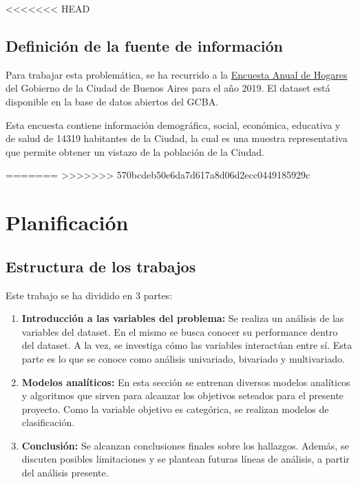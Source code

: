 \documentclass[a4paper]{article}
\begin{document}
<<<<<<< HEAD
    \subsection{Definición de la fuente de información}

        Para trabajar esta problemática, se ha recurrido a la \href{https://data.buenosaires.gob.ar/dataset/encuesta-anual-hogares/resource/3a45c563-396d-42de-ba93-8a93729e0723}{Encuesta Anual de Hogares} del Gobierno de la Ciudad de Buenos Aires para el año 2019. El dataset está disponible en la base de datos abiertos del GCBA.

        Esta encuesta contiene información demográfica, social, económica, educativa y de salud de 14319 habitantes de la Ciudad, la cual es una muestra representativa que permite obtener un vistazo de la población de la Ciudad.


=======
>>>>>>> 570bcdeb50e6da7d617a8d06d2ecc0449185929c
\newpage

\section{Planificación}

    \subsection*{Estructura de los trabajos}

        Este trabajo se ha dividido en 3 partes:
        \begin{enumerate}
            \item \textbf{Introducción a las variables del problema:} Se realiza un análisis de las variables del dataset. En el mismo se busca conocer su performance dentro del dataset. A la vez, se investiga cómo las variables interactúan entre sí. Esta parte es lo que se conoce como análisis univariado, bivariado y multivariado.
            \item \textbf{Modelos analíticos:} En esta sección se entrenan diversos modelos analíticos y algoritmos que sirven para alcanzar los objetivos seteados para el presente proyecto. Como la variable objetivo es categórica, se realizan modelos de clasificación.
            \item \textbf{Conclusión:} Se alcanzan conclusiones finales sobre los hallazgos. Además, se discuten posibles limitaciones y se plantean futuras líneas de análisis, a partir del análisis presente.
            
        \end{enumerate}
\end{document}
